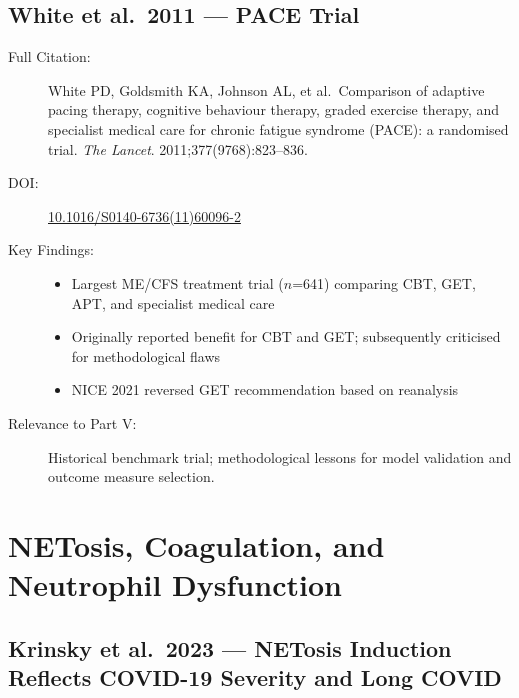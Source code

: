 \subsection{White et al.\ 2011 --- PACE Trial}

\begin{description}
    \item[Full Citation:] White PD, Goldsmith KA, Johnson AL, et al.\ Comparison of adaptive pacing therapy, cognitive behaviour therapy, graded exercise therapy, and specialist medical care for chronic fatigue syndrome (PACE): a randomised trial. \textit{The Lancet}. 2011;377(9768):823--836. \cite{White2011pace}
    \item[DOI:] \href{https://doi.org/10.1016/S0140-6736(11)60096-2}{10.1016/S0140-6736(11)60096-2}
    \item[Key Findings:]
    \begin{itemize}
        \item Largest ME/CFS treatment trial ($n$=641) comparing CBT, GET, APT, and specialist medical care
        \item Originally reported benefit for CBT and GET; subsequently criticised for methodological flaws
        \item NICE 2021 reversed GET recommendation based on reanalysis
    \end{itemize}
    \item[Relevance to Part V:] Historical benchmark trial; methodological lessons for model validation and outcome measure selection.
\end{description}


\section{NETosis, Coagulation, and Neutrophil Dysfunction}
\label{sec:bib-nets-coagulation-2026}

\subsection{Krinsky et al.\ 2023 --- NETosis Induction Reflects COVID-19 Severity and Long COVID}

